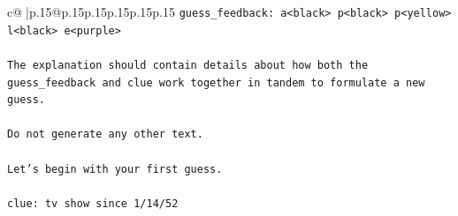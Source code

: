 \documentclass{article}
\begin{document}
{\begin{supertabular}{c@{$\;$}|p{.15\linewidth}@{}p{.15\linewidth}p{.15\linewidth}p{.15\linewidth}p{.15\linewidth}p{.15\linewidth}}
{{{\texttt{guess\_feedback: a<black> p<black> p<yellow> l<black> e<purple>} \\
\\ 
\texttt{The explanation should contain details about how both the guess\_feedback and clue work together in tandem to formulate a new guess.} \\
\\ 
\texttt{Do not generate any other text.} \\
\\ 
\texttt{Let's begin with your first guess.} \\
\\ 
\texttt{clue: tv show since 1/14/52} \\
            }
        }
    }
     \\ \\


\end{supertabular}}
\end{document}
